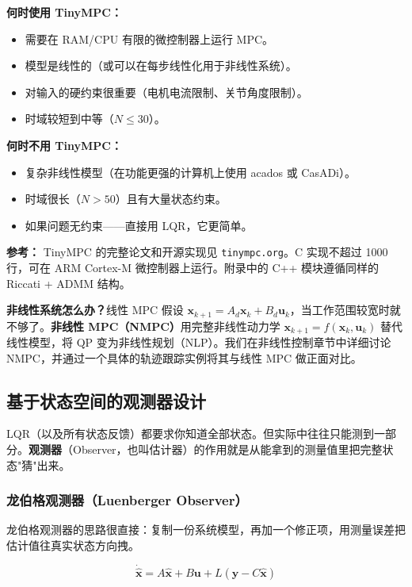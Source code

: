 \textbf{何时使用 TinyMPC：}
\begin{itemize}
    \item 需要在 RAM/CPU 有限的微控制器上运行 MPC。
    \item 模型是线性的（或可以在每步线性化用于非线性系统）。
    \item 对输入的硬约束很重要（电机电流限制、关节角度限制）。
    \item 时域较短到中等（$N \leq 30$）。
\end{itemize}

\textbf{何时不用 TinyMPC：}
\begin{itemize}
    \item 复杂非线性模型（在功能更强的计算机上使用 acados 或 CasADi）。
    \item 时域很长（$N > 50$）且有大量状态约束。
    \item 如果问题无约束——直接用 LQR，它更简单。
\end{itemize}

\textbf{参考：} TinyMPC 的完整论文和开源实现见 \texttt{tinympc.org}。C 实现不超过 1000 行，可在 ARM Cortex-M 微控制器上运行。附录中的 C++ 模块遵循同样的 Riccati + ADMM 结构。

\textbf{非线性系统怎么办？}线性 MPC 假设 $\mathbf{x}_{k+1} = A_d \mathbf{x}_k + B_d \mathbf{u}_k$，当工作范围较宽时就不够了。\textbf{非线性 MPC（NMPC）}用完整非线性动力学 $\mathbf{x}_{k+1} = f(\mathbf{x}_k, \mathbf{u}_k)$ 替代线性模型，将 QP 变为非线性规划（NLP）。我们在非线性控制章节中详细讨论 NMPC，并通过一个具体的轨迹跟踪实例将其与线性 MPC 做正面对比。

\subsection{基于状态空间的观测器设计}

LQR（以及所有状态反馈）都要求你知道全部状态。但实际中往往只能测到一部分。\textbf{观测器}（Observer，也叫估计器）的作用就是从能拿到的测量值里把完整状态"猜"出来。

\subsubsection{龙伯格观测器（Luenberger Observer）}

龙伯格观测器的思路很直接：复制一份系统模型，再加一个修正项，用测量误差把估计值往真实状态方向拽。

\begin{equation}
\dot{\hat{\mathbf{x}}} = A\hat{\mathbf{x}} + B\mathbf{u} + L(\mathbf{y} - C\hat{\mathbf{x}})
\end{equation}

